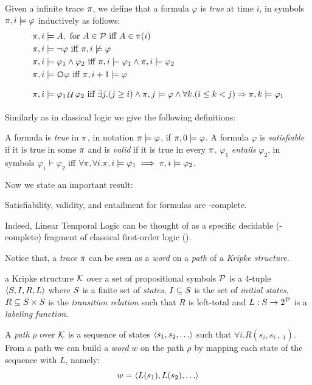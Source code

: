 \begin{definition}\label{ltl-satisfaction}
	Given a infinite trace $\pi$, we define that a \LTL formula $\varphi$ is \emph{true} at time $i$, in symbols $\pi, i \models \varphi$ inductively as follows:
	\begin{align*}
	\trace, i &\models A, \tm{for} A\in\Prop \tiff A \in \trace(i)\\
	\trace, i &\models \lnot \varphi \tiff \trace, i \not\models \varphi\\
	\trace, i &\models \varphi_1 \lAND \varphi_2 \tiff \trace, i \models \varphi_1 \lAND \trace, i \models \varphi_2\\
	\trace, i &\models \Next\varphi \tiff \trace,i+1 \models \varphi\\
	\trace, i &\models \varphi_1 \lUntil \varphi_2 \tiff \exists j. (j\ge i) \lAND \trace,j \models \varphi \lAND\forall k. (i\le k < j) \Rightarrow \trace, k \models \varphi_1\\
	\end{align*}
\end{definition}
Similarly as in classical logic we give the following definitions:
\begin{definition}\label{ltl-sat-val-ent}
	A \LTL formula is \emph{true} in $\pi$, in notation $\pi \models \varphi$, if $\pi, 0 \models \varphi$. A formula $\varphi$ is \emph{satisfiable} if it is true in some $\pi$ and is \emph{valid} if it is true in every $\pi$. $\varphi_1$ \emph{entails} $\varphi_2$, in symbols $\varphi_1 \models \varphi_2$ iff $\forall \pi, \forall i.\pi, i \models \varphi_1 \implies \pi, i \models \varphi_2$.
\end{definition}

Now we state an important result:
\begin{theorem}
	Satisfiability, validity, and entailment for \LTL formulas are \PSPACE-complete.
\end{theorem}
Indeed, Linear Temporal Logic can be thought of as a specific decidable (\PSPACE-complete) fragment of classical first-order logic (\FOL).

Notice that, a \emph{trace} $\pi$ can be seen as a \emph{word} on a \emph{path} of a \emph{Kripke structure}.
\begin{definition}\label{kripke}
	a Kripke structure $\mathcal{K}$ over a set of propositional symbols $\mathcal{P}$ is a 4-tuple $\langle S, I, R, L \rangle$ where $S$ is a finite set of \emph{states}, $I\subseteq S$ is the set of \emph{initial states}, $R \subseteq S \times S$ is the \emph{transition relation} such that $R$ is left-total and $L: S \to 2^{\mathcal{P}}$ is a \emph{labeling function}.
\end{definition}
A \emph{path} $\rho$ over $\mathcal{K}$ is a sequence of states $\tup{s_1, s_2, \dots}$ such that $\forall i. R(s_i, s_{i+1})$. From a path we can build a \emph{word} $w$ on the path $\rho$ by  
mapping each state of the sequence with $L$, namely:
\[
w = \tup{L(s_1), L(s_2), \dots}
\]

